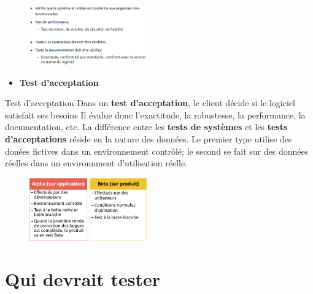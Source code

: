 \documentclass[16pt]{report}
\begin{document}
\begin{multicols*}{2}
       \begin{figure}[H]
        \begin{center}
            \includegraphics[width=0.45\textwidth]{testfonc2.png}
        \end{center}
       \end{figure}


       \begin{itemize}
        \item \textbf{Test d'acceptation}  
       \end{itemize}


       \begin{Concept}{Test d'acceptation}{}
           Dans un \textbf{test d'acceptation}, le client décide si le logiciel satisfait ses besoins  
           Il évalue donc l'exactitude, la robustesse, la performance, la documentation, etc. 
           La différence entre les \textbf{tests de systèmes} et les \textbf{tests d'acceptations} 
           réside en la nature des données. Le premier type utilise des 
           \textcolor{myb}{donées fictives} dans un \textcolor{myb}{environnement contrôlé}; le second 
           se fait sur des \textcolor{myb}{données réelles} dans un \textcolor{myb}{environnment d'utilisation réelle}.   

       \end{Concept}


       \begin{figure}[H]
        \begin{center}
            \includegraphics[width=0.45\textwidth]{TAlphaBeta.png}
        \end{center}
       \end{figure}

       \section{Qui devrait tester}


\end{multicols*}
\end{document}
